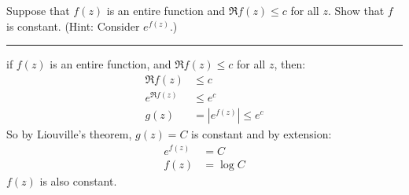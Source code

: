 \begin{example}

    Suppose that $f(z)$ is an entire function and $\Re f(z) \leq c$ for all $z$. Show that $f$ is constant. (Hint: Consider $e^{f(z)}$.)

    \hrule
    \vspace{0.5cm}

    if $f(z)$ is an entire function, and $\Re f(z) \leq c$ for all $z$, then:
    \begin{align*}
        \Re f(z)     & \leq c                \\
        e^{\Re f(z)} & \leq e^c              \\
        g(z)         & = |e^{f(z)}| \leq e^c
    \end{align*}
    So by Liouville's theorem, $g(z) = C$ is constant and by extension:
    \begin{align*}
        e^{f(z)} & = C      \\
        f(z)     & = \log C
    \end{align*}
    $f(z)$ is also constant.
\end{example}

